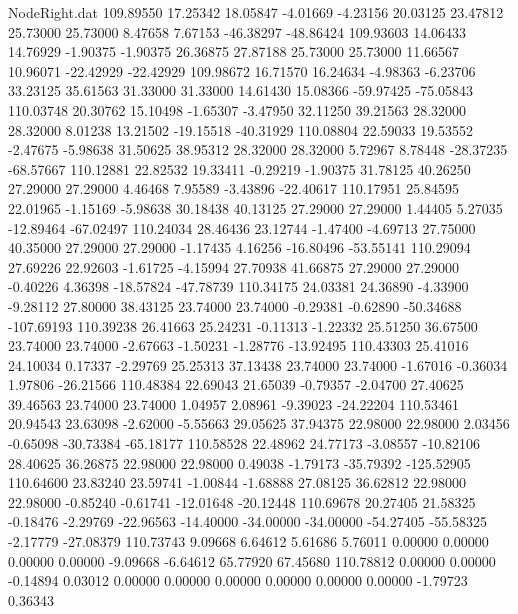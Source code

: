 \begin{filecontents}{NodeRight.dat}
 109.89550   17.25342   18.05847    -4.01669   -4.23156   20.03125   23.47812   25.73000   25.73000    8.47658    7.67153  -46.38297  -48.86424
 109.93603   14.06433   14.76929    -1.90375   -1.90375   26.36875   27.87188   25.73000   25.73000   11.66567   10.96071  -22.42929  -22.42929
 109.98672   16.71570   16.24634    -4.98363   -6.23706   33.23125   35.61563   31.33000   31.33000   14.61430   15.08366  -59.97425  -75.05843
 110.03748   20.30762   15.10498    -1.65307   -3.47950   32.11250   39.21563   28.32000   28.32000    8.01238   13.21502  -19.15518  -40.31929
 110.08804   22.59033   19.53552    -2.47675   -5.98638   31.50625   38.95312   28.32000   28.32000    5.72967    8.78448  -28.37235  -68.57667
 110.12881   22.82532   19.33411    -0.29219   -1.90375   31.78125   40.26250   27.29000   27.29000    4.46468    7.95589   -3.43896  -22.40617
 110.17951   25.84595   22.01965    -1.15169   -5.98638   30.18438   40.13125   27.29000   27.29000    1.44405    5.27035  -12.89464  -67.02497
 110.24034   28.46436   23.12744    -1.47400   -4.69713   27.75000   40.35000   27.29000   27.29000   -1.17435    4.16256  -16.80496  -53.55141
 110.29094   27.69226   22.92603    -1.61725   -4.15994   27.70938   41.66875   27.29000   27.29000   -0.40226    4.36398  -18.57824  -47.78739
 110.34175   24.03381   24.36890    -4.33900   -9.28112   27.80000   38.43125   23.74000   23.74000   -0.29381   -0.62890  -50.34688 -107.69193
 110.39238   26.41663   25.24231    -0.11313   -1.22332   25.51250   36.67500   23.74000   23.74000   -2.67663   -1.50231   -1.28776  -13.92495
 110.43303   25.41016   24.10034     0.17337   -2.29769   25.25313   37.13438   23.74000   23.74000   -1.67016   -0.36034    1.97806  -26.21566
 110.48384   22.69043   21.65039    -0.79357   -2.04700   27.40625   39.46563   23.74000   23.74000    1.04957    2.08961   -9.39023  -24.22204
 110.53461   20.94543   23.63098    -2.62000   -5.55663   29.05625   37.94375   22.98000   22.98000    2.03456   -0.65098  -30.73384  -65.18177
 110.58528   22.48962   24.77173    -3.08557  -10.82106   28.40625   36.26875   22.98000   22.98000    0.49038   -1.79173  -35.79392 -125.52905
 110.64600   23.83240   23.59741    -1.00844   -1.68888   27.08125   36.62812   22.98000   22.98000   -0.85240   -0.61741  -12.01648  -20.12448
 110.69678   20.27405   21.58325    -0.18476   -2.29769  -22.96563  -14.40000  -34.00000  -34.00000  -54.27405  -55.58325   -2.17779  -27.08379
 110.73743    9.09668    6.64612     5.61686    5.76011    0.00000    0.00000    0.00000    0.00000   -9.09668   -6.64612   65.77920   67.45680
 110.78812    0.00000    0.00000    -0.14894    0.03012    0.00000    0.00000    0.00000    0.00000    0.00000    0.00000   -1.79723    0.36343

\end{filecontents}
